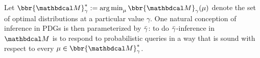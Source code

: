 Let $\bbr{\dg M}^*_\gamma := \argmin_\mu \bbr{\dg M}_\gamma(\mu)$ denote
the set of optimal distributions at a particular value $\gamma$.
%
%
%
One natural conception of inference in PDGs is then parameterized by
${\bar\gamma}$:
to do ${\bar\gamma}$-inference
in $\dg M$ is to respond to probabilistic queries in a way that is sound with respect to every $\mu \in \bbr{\dg M}^*_\gamma$.
